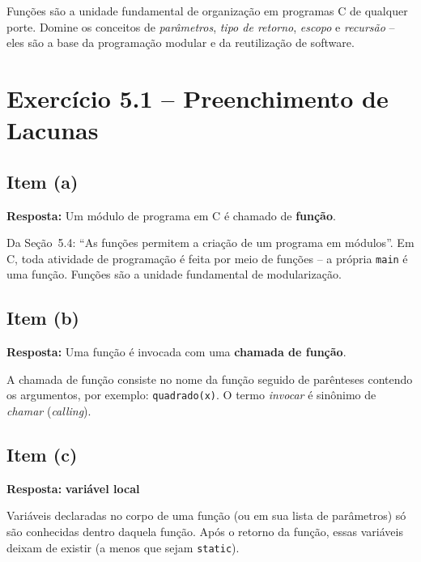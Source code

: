 \documentclass[12pt,a4paper]{article}
\begin{document}
\begin{boaprática}
  Funções são a unidade fundamental de organização em programas C de qualquer porte.
  Domine os conceitos de \textit{parâmetros}, \textit{tipo de retorno}, \textit{escopo}
  e \textit{recursão} -- eles são a base da programação modular e da reutilização
  de software.
\end{boaprática}

\tableofcontents\newpage

\section{Exercício 5.1 -- Preenchimento de Lacunas}

\subsection*{Item (a)}
\begin{respostabox}
\textbf{Resposta:} Um módulo de programa em C é chamado de \textcolor{deitelblue}{\textbf{função}}.

Da Seção~5.4: ``As funções permitem a criação de um programa em módulos''. Em C,
toda atividade de programação é feita por meio de funções -- a própria \texttt{main}
é uma função. Funções são a unidade fundamental de modularização.
\end{respostabox}

\subsection*{Item (b)}
\begin{respostabox}
\textbf{Resposta:} Uma função é invocada com uma \textcolor{deitelblue}{\textbf{chamada de função}}.

A chamada de função consiste no nome da função seguido de parênteses contendo os
argumentos, por exemplo: \texttt{quadrado(x)}. O termo \textit{invocar} é sinônimo
de \textit{chamar} (\textit{calling}).
\end{respostabox}

\subsection*{Item (c)}
\begin{respostabox}
\textbf{Resposta:} \textcolor{deitelblue}{\textbf{variável local}}

Variáveis declaradas no corpo de uma função (ou em sua lista de parâmetros) só são
conhecidas dentro daquela função. Após o retorno da função, essas variáveis deixam
de existir (a menos que sejam \texttt{static}).
\end{respostabox}
\end{document}
